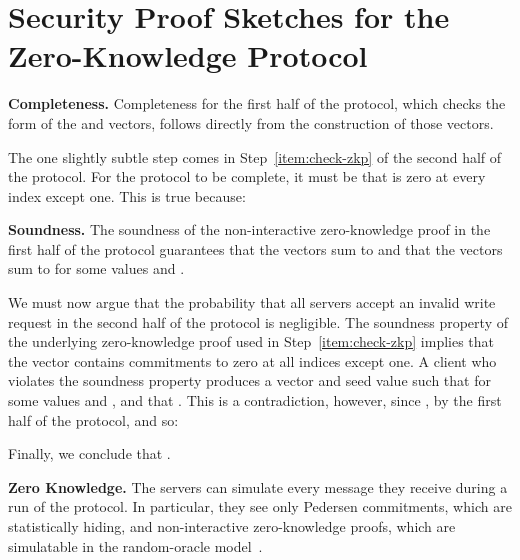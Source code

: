 \documentclass[10pt,twocolumn]{article}
\newcommand{\nicepara}[1]{\medskip\noindent\textbf{#1.}}
\begin{document}
{ \section{Security Proof Sketches for the\\Zero-Knowledge Protocol}
\label{app:zkp-proof}

\nicepara{Completeness}
Completeness for the first half of the protocol,
which checks the form of the  and  vectors,
follows directly from the construction of those vectors.

The one slightly subtle step comes in Step~\ref{item:check-zkp}
of the second half of the protocol. 
For the protocol to be complete, it must be that
 is zero at every index except one.
This is true because:


\nicepara{Soundness}
The soundness of the non-interactive zero-knowledge proof 
in the first half of the protocol guarantees that
the  vectors sum to  and that
the  vectors sum to  for
some values  and .

We must now argue that the probability that all servers
accept an invalid write request in the second half of the 
protocol is negligible.
The soundness property of the underlying
zero-knowledge proof used in Step~\ref{item:check-zkp}
implies that the vector  contains
commitments to zero at all indices except one.
A client who violates the soundness property produces
a vector  and seed value  such
that 
for some values  and , and that
.
This is a contradiction, however, since 
, by the first
half of the protocol, and so:

Finally, we conclude that .

\nicepara{Zero Knowledge}
The servers can simulate every message they receive during
a run of the protocol.
In particular, they see only Pedersen commitments, which
are statistically hiding, and non-interactive zero-knowledge
proofs, which are simulatable in the random-oracle 
model~\cite{bellare1993random}.

 }
\end{document}
